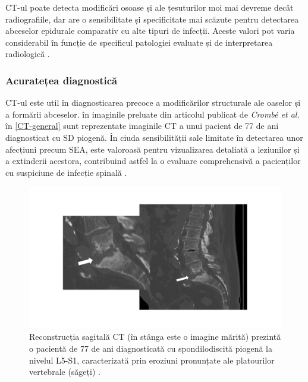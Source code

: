 \message{ !name(LaMain.tex)}\documentclass[romanian,12pt,a4paper]{article}
\begin{document}
CT-ul poate detecta modificări osoase și ale țesuturilor moi mai devreme
decât radiografiile, dar are o sensibilitate și specificitate mai
scăzute pentru detectarea abceselor epidurale comparativ cu alte tipuri
de infecții. Aceste valori pot varia considerabil în funcție de
specificul patologiei evaluate și de interpretarea radiologică
\cite{ImagingCharacteristicsCT2022}\cite{ImagingAssessmentSpine2024}.

\subsubsection{Acuratețea diagnostică}

CT-ul este util în diagnosticarea precoce a modificărilor structurale
ale oaselor și a formării abceselor. în imaginile preluate din articolul
publicat de \emph{Crombé et al.} în \ref{CT-general}{}
sunt reprezentate imaginile CT a unui pacient de 77 de ani diagnosticat
cu SD piogenă. În ciuda sensibilității sale limitate în detectarea unor
afecțiuni precum SEA, este valoroasă pentru vizualizarea detaliată a
leziunilor și a extinderii acestora, contribuind astfel la o evaluare
comprehensivă a pacienților cu suspiciune de infecție spinală
\cite{ImagingCharacteristicsCT2022}\cite{ImagingAssessmentSpine2024}.

\begin{figure}
\centering
\includegraphics[width=\textwidth]{Files/CT-general.png}
\caption{Reconstrucția sagitală CT (în stânga este o imagine mărită)
prezintă o pacientă de 77 de ani diagnosticată cu spondilodiscită
piogenă la nivelul L5-S1, caracterizată prin eroziuni pronunțate ale
platourilor vertebrale (săgeți)
\cite{ImagingSpondylodiscitisComprehensive2024}.}
\end{figure}

\label{CT-general}{}
\end{document}
